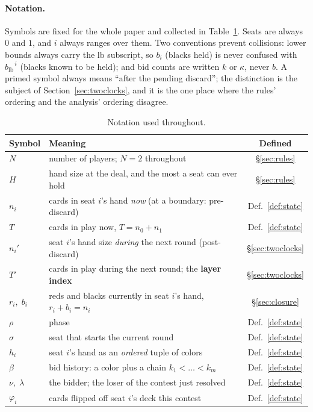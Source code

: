 \documentclass[11pt]{article}
\theoremstyle{plain}
\theoremstyle{definition}
\theoremstyle{remark}
\newcommand{\blb}{\ensuremath{b_{\mathrm{lb}}}}
\begin{document}
\paragraph{Notation.} Symbols are fixed for the whole paper and collected
in Table~\ref{tab:notation}. Seats are always $0$ and $1$, and $i$ always
ranges over them. Two conventions prevent collisions: lower bounds always
carry the $\mathrm{lb}$ subscript, so $b_i$ (blacks held) is never confused
with $\blb^{\,i}$ (blacks known to be held); and bid counts are written $k$
or $\kappa$, never $b$. A primed symbol always means ``after the pending
discard''; the distinction is the subject of Section~\ref{sec:twoclocks},
and it is the one place where the rules' ordering and the analysis'
ordering disagree.

\begin{table}[htbp]
\centering
\caption{Notation used throughout.}
\label{tab:notation}
\small
\begin{tabular}{@{}llc@{}}
\toprule
Symbol & Meaning & Defined \\
\midrule
$N$ & number of players; $N=2$ throughout & \S\ref{sec:rules}\\
$H$ & hand size at the deal, and the most a seat can ever hold & \S\ref{sec:rules}\\
$n_i$ & cards in seat $i$'s hand \emph{now} (at a boundary: pre-discard) & Def.~\ref{def:state}\\
$T$ & cards in play now, $T=n_0+n_1$ & Def.~\ref{def:state}\\
$n_i'$ & seat $i$'s hand size \emph{during} the next round (post-discard) & \S\ref{sec:twoclocks}\\
$T'$ & cards in play during the next round; the \textbf{layer index} & \S\ref{sec:twoclocks}\\
$r_i,\;b_i$ & reds and blacks currently in seat $i$'s hand, $r_i+b_i=n_i$ & \S\ref{sec:closure}\\
$\rho$ & phase & Def.~\ref{def:state}\\
$\sigma$ & seat that starts the current round & Def.~\ref{def:state}\\
$h_i$ & seat $i$'s hand as an \emph{ordered} tuple of colors & Def.~\ref{def:state}\\
$\beta$ & bid history: a color plus a chain $k_1<\dots<k_m$ & Def.~\ref{def:state}\\
$\nu,\;\lambda$ & the bidder; the loser of the contest just resolved & Def.~\ref{def:state}\\
$\varphi_i$ & cards flipped off seat $i$'s deck this contest & Def.~\ref{def:state}\\

\end{tabular}
\end{table}
\end{document}
